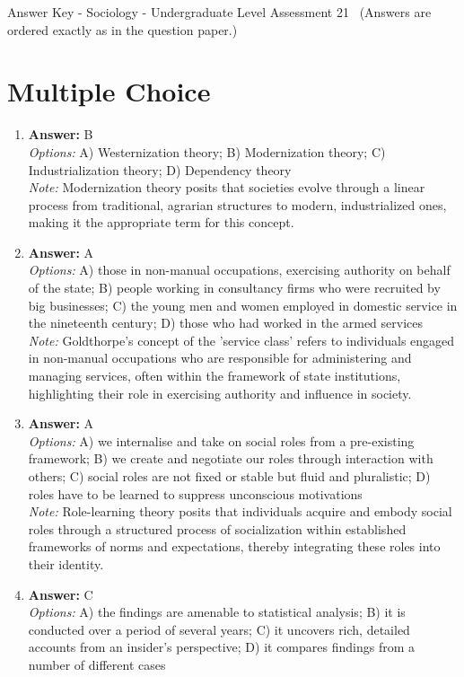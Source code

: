 \documentclass[12pt]{article}
\begin{document}
\begin{center}
Answer Key - Sociology - Undergraduate Level Assessment 21 \
\small (Answers are ordered exactly as in the question paper.)
\end{center}

\section*{Multiple Choice}
\begin{enumerate}[label=\arabic*.]
\item \textbf{Answer:} B
\\ \textit{Options:} A) Westernization theory; B) Modernization theory; C) Industrialization theory; D) Dependency theory
\\ \textit{Note:} Modernization theory posits that societies evolve through a linear process from traditional, agrarian structures to modern, industrialized ones, making it the appropriate term for this concept.
\item \textbf{Answer:} A
\\ \textit{Options:} A) those in non-manual occupations, exercising authority on behalf of the state; B) people working in consultancy firms who were recruited by big businesses; C) the young men and women employed in domestic service in the nineteenth century; D) those who had worked in the armed services
\\ \textit{Note:} Goldthorpe's concept of the 'service class' refers to individuals engaged in non-manual occupations who are responsible for administering and managing services, often within the framework of state institutions, highlighting their role in exercising authority and influence in society.
\item \textbf{Answer:} A
\\ \textit{Options:} A) we internalise and take on social roles from a pre-existing framework; B) we create and negotiate our roles through interaction with others; C) social roles are not fixed or stable but fluid and pluralistic; D) roles have to be learned to suppress unconscious motivations
\\ \textit{Note:} Role-learning theory posits that individuals acquire and embody social roles through a structured process of socialization within established frameworks of norms and expectations, thereby integrating these roles into their identity.
\item \textbf{Answer:} C
\\ \textit{Options:} A) the findings are amenable to statistical analysis; B) it is conducted over a period of several years; C) it uncovers rich, detailed accounts from an insider's perspective; D) it compares findings from a number of different cases

\end{enumerate}
\end{document}
